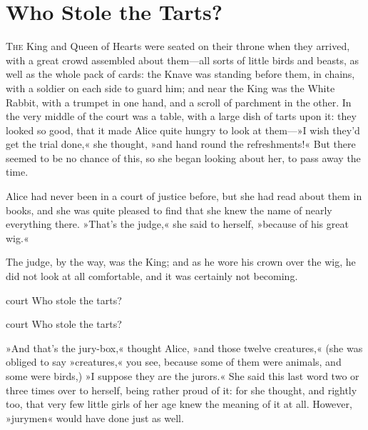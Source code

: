 \chapter{Who Stole the Tarts?}

\lettrine[lines=4,findent=2pt]{T}{he} King and Queen of Hearts were seated on their throne when they arrived, with a great crowd assembled about them—all sorts of little birds and beasts, as well as the whole pack of cards: the Knave was standing before them, in chains, with a soldier on each side to guard him; and near the King was the White Rabbit, with a trumpet in one hand, and a scroll of parchment in the other. In the very middle of the court was a table, with a large dish of tarts upon it: they looked so good, that it made Alice quite hungry to look at them—»I wish they'd get the trial done,« she thought, »and hand round the refreshments!« But there seemed to be no chance of this, so she began looking about her, to pass away the time.

Alice had never been in a court of justice before, but she had read about them in books, and she was quite pleased to find that she knew the name of nearly everything there. »That's the judge,« she said to herself, »because of his great wig.«

The judge, by the way, was the King; and as he wore his crown over the wig, he did not look at all comfortable, and it was certainly not becoming.


\begin{pictures}
	\begin{letter}
		\begin{colorbigpic}
			[1.1]
			{court}
			{Who stole the tarts?}
		\end{colorbigpic}
	\end{letter}
	
	\begin{a4}
		\begin{colorbigpic}
			[1.0]
			{court}
			{Who stole the tarts?}
		\end{colorbigpic}
	\end{a4}	
\end{pictures}


»And that's the jury-box,« thought Alice, »and those twelve creatures,« (she was obliged to say »creatures,« you see, because some of them were animals, and some were birds,) »I suppose they are the jurors.« She said this last word two or three times over to herself, being rather proud of it: for she thought, and rightly too, that very few little girls of her age knew the meaning of it at all. However, »jurymen« would have done just as well.

